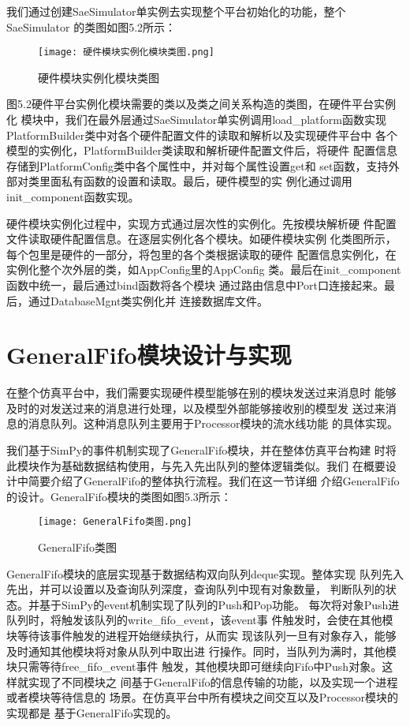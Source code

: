 我们通过创建SaeSimulator单实例去实现整个平台初始化的功能，整个SaeSimulator
的类图如图5.2所示：

\begin{figure}
    \centering
    \texttt{[image: 硬件模块实例化模块类图.png]}
    \caption{硬件模块实例化模块类图}
    \label{fig:badge}
\end{figure}

图5.2硬件平台实例化模块需要的类以及类之间关系构造的类图，在硬件平台实例化
模块中，我们在最外层通过SaeSimulator单实例调用load\_platform函数实现
PlatformBuilder类中对各个硬件配置文件的读取和解析以及实现硬件平台中
各个模型的实例化，PlatformBuilder类读取和解析硬件配置文件后，将硬件
配置信息存储到PlatformConfig类中各个属性中，并对每个属性设置get和
set函数，支持外部对类里面私有函数的设置和读取。最后，硬件模型的实
例化通过调用init\_component函数实现。

硬件模块实例化过程中，实现方式通过层次性的实例化。先按模块解析硬
件配置文件读取硬件配置信息。在逐层实例化各个模块。如硬件模块实例
化类图所示，每个包里是硬件的一部分，将包里的各个类根据读取的硬件
配置信息实例化，在实例化整个次外层的类，如AppConfig里的AppConfig
类。最后在init\_component函数中统一，最后通过bind函数将各个模块
通过路由信息中Port口连接起来。最后，通过DatabaseMgnt类实例化并
连接数据库文件。

\section{GeneralFifo模块设计与实现}

在整个仿真平台中，我们需要实现硬件模型能够在别的模块发送过来消息时
能够及时的对发送过来的消息进行处理，以及模型外部能够接收别的模型发
送过来消息的消息队列。这种消息队列主要用于Processor模块的流水线功能
的具体实现。

我们基于SimPy的事件机制实现了GeneralFifo模块，并在整体仿真平台构建
时将此模块作为基础数据结构使用，与先入先出队列的整体逻辑类似。我们
在概要设计中简要介绍了GeneralFifo的整体执行流程。我们在这一节详细
介绍GeneralFifo的设计。GeneralFifo模块的类图如图5.3所示：
\begin{figure}
    \centering
    \texttt{[image: GeneralFifo类图.png]}
    \caption{GeneralFifo类图}
    \label{fig:badge}
\end{figure}

GeneralFifo模块的底层实现基于数据结构双向队列deque实现。整体实现
队列先入先出，并可以设置以及查询队列深度，查询队列中现有对象数量，
判断队列的状态。并基于SimPy的event机制实现了队列的Push和Pop功能。
每次将对象Push进队列时，将触发该队列的write\_fifo\_event，该event事
件触发时，会使在其他模块等待该事件触发的进程开始继续执行，从而实
现该队列一旦有对象存入，能够及时通知其他模块将对象从队列中取出进
行操作。同时，当队列为满时，其他模块只需等待free\_fifo\_event事件
触发，其他模块即可继续向Fifo中Push对象。这样就实现了不同模块之
间基于GeneralFifo的信息传输的功能，以及实现一个进程或者模块等待信息的
场景。在仿真平台中所有模块之间交互以及Processor模块的实现都是
基于GeneralFifo实现的。

